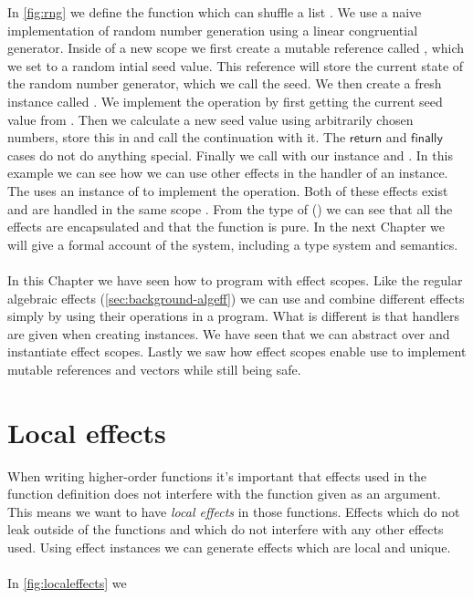 In \cref{fig:rng} we define the function  which can shuffle a list .
We use a naive implementation of random number generation using a linear congruential generator.
Inside of a new scope  we first create a mutable reference called , which we set to a random intial seed value.
This reference will store the current state of the random number generator, which we call the seed.
We then create a fresh  instance called .
We implement the  operation by first getting the current seed value from .
Then we calculate a new seed value using arbitrarily chosen numbers, store this in  and call the continuation with it.
The $\mathsf{return}$ and $\mathsf{finally}$ cases do not do anything special.
Finally we call  with our  instance and .
In this example we can see how we can use other effects in the handler of an instance.
The  uses an instance of  to implement the  operation.
Both of these effects exist and are handled in the same scope .
From the type of  () we can see that all the effects are encapsulated and that the function is pure.
In the next Chapter we will give a formal account of the system, including a type system and semantics.
\\\\
In this Chapter we have seen how to program with effect scopes.
Like the regular algebraic effects (\cref{sec:background-algeff}) we can use and combine different effects simply by using their operations in a program.
What is different is that handlers are given when creating instances.
We have seen that we can abstract over and instantiate effect scopes.
Lastly we saw how effect scopes enable use to implement mutable references and vectors while still being safe.

\iffalse
\section{Local effects}
When writing higher-order functions it's important that effects used in the function definition does not interfere with the function given as an argument.
This means we want to have \emph{local effects} in those functions.
Effects which do not leak outside of the functions and which do not interfere with any other effects used.
Using effect instances we can generate effects which are local and unique.
\\\\
In \cref{fig:localeffects} we 

